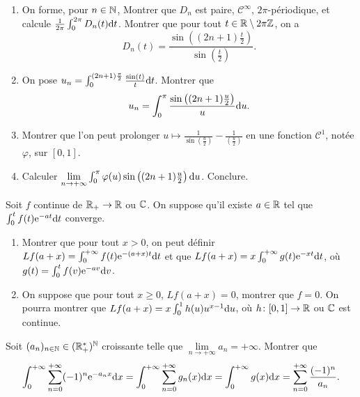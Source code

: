 \documentclass[12pt]{article}
\begin{document}
\begin{exercise}
    \phantom{}
    \begin{enumerate}
        \item On forme, pour $n\in\mathbb{N}$, 
        Montrer que $D_n$ est paire, $\mathcal{C}^{\infty}$, $2\pi$-périodique, et calcule $\frac{1}{2\pi}\int_{0}^{2\pi}D_n(t)\mathrm{d} t$. Montrer que pour tout $t\in\mathbb{R}\setminus2\pi\mathbb{Z}$, on a 
        \begin{equation}
            D_n(t)=\frac{\sin\left((2n+1)\frac{t}{2}\right)}{\sin\left(\frac{t}{2}\right)}.
        \end{equation}

        \item On pose $u_n=\int_{0}^{(2n+1)\frac{\pi}{2}}\frac{\sin(t)}{t}\mathrm{d} t$. Montrer que 
        \begin{equation}
            u_n=\int_{0}^{\pi}\frac{\sin\left((2n+1)\frac{u}{2}\right)}{u}\mathrm{d} u.
        \end{equation}

        \item Montrer que l'on peut prolonger $u\mapsto \frac{1}{\sin\left(\frac{u}{2}\right)}-\frac{1}{\left(\frac{u}{2}\right)}$ en une fonction $\mathcal{C}^{1}$, notée $\varphi$, sur $[0,1]$.
        \item Calculer $\lim\limits_{n\to+\infty}\int_{0}^{\pi}\varphi(u)\sin\left((2n+1)\frac{u}{2}\right)\mathrm{d} u$. Conclure.
    \end{enumerate}
\end{exercise}

\begin{exercise}
    Soit $f$ continue de $\mathbb{R}_{+}\to\mathbb{R}$ ou $\mathbb{C}$. On suppose qu'il existe $a\in\mathbb{R}$ tel que $\int_{0}^{t}f(t)\mathrm{e}^{-a t}\mathrm{d} t$ converge.
    \begin{enumerate}
        \item Montrer que pour tout $x>0$, on peut définir $Lf(a+x)=\int_{0}^{+\infty}f(t)\mathrm{e}^{-(a+x)t}\mathrm{d} t$ et que $Lf(a+x)=x\int_{0}^{+\infty}g(t)\mathrm{e}^{-xt}\mathrm{d} t$, où $g(t)=\int_{0}^{t}f(v)\mathrm{e}^{-av}\mathrm{d} v$.
        \item On suppose que pour tout $x\geqslant 0$, $Lf(a+x)=0$, montrer que $f=0$. On pourra montrer que $Lf(a+x)=x\int_{0}^{1}h(u)u^{x-1}\mathrm{d} u$, où $h\colon[0,1]\to\mathbb{R}$ ou $\mathbb{C}$ est continue.
    \end{enumerate}
\end{exercise}

\begin{exercise}
    Soit $(a_n)_{n\in\mathbb{N}}\in(\mathbb{R}_{+}^{*})^{\mathbb{N}}$ croissante telle que $\lim\limits_{n\to+\infty}a_n=+\infty$. Montrer que 
    \begin{equation}
        \int_{0}^{+\infty}\sum_{n=0}^{+\infty}(-1)^{n}\mathrm{e}^{-a_n x}\mathrm{d} x=\int_{0}^{+\infty}\sum_{n=0}^{+\infty}g_n(x)\mathrm{d} x=\int_{0}^{+\infty}g(x)\mathrm{d} x=\sum_{n=0}^{+\infty}\frac{(-1)^{n}}{a_n}.
    \end{equation}
\end{exercise}
\end{document}
